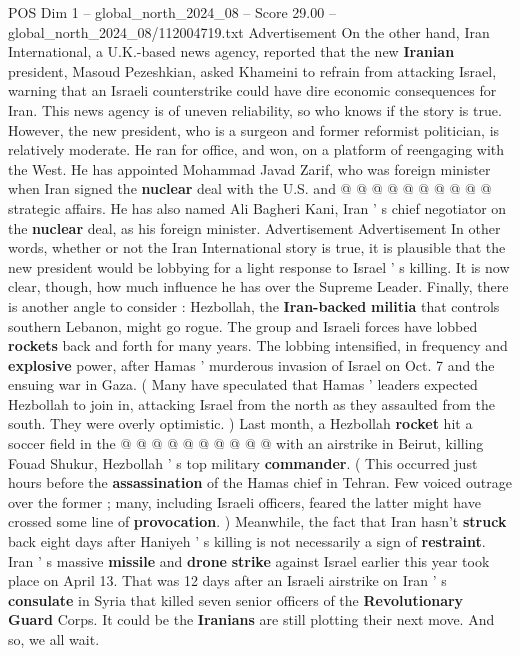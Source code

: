 \begin{textsample}{POS Dim 1 – global\_north\_2024\_08 – Score 29.00 – global\_north\_2024\_08/112004719.txt}
Advertisement On the other hand, Iran International, a U.K.-based news agency, reported that the new \textbf{Iranian} president, Masoud Pezeshkian, asked Khameini to refrain from attacking Israel, warning that an Israeli counterstrike could have dire economic consequences for Iran.
This news agency is of uneven reliability, so who knows if the story is true.
However, the new president, who is a surgeon and former reformist politician, is relatively moderate.
He ran for office, and won, on a platform of reengaging with the West.
He has appointed Mohammad Javad Zarif, who was foreign minister when Iran signed the \textbf{nuclear} deal with the U.S. and @ @ @ @ @ @ @ @ @ @ strategic affairs.
He has also named Ali Bagheri Kani, Iran ' s chief negotiator on the \textbf{nuclear} deal, as his foreign minister.
Advertisement Advertisement In other words, whether or not the Iran International story is true, it is plausible that the new president would be lobbying for a light response to Israel ' s killing.
It is now clear, though, how much influence he has over the Supreme Leader.
Finally, there is another angle to consider : Hezbollah, the \textbf{Iran-backed} \textbf{militia} that controls southern Lebanon, might go rogue.
The group and Israeli forces have lobbed \textbf{rockets} back and forth for many years.
The lobbing intensified, in frequency and \textbf{explosive} power, after Hamas ' murderous invasion of Israel on Oct. 7 and the ensuing war in Gaza. ( Many have speculated that Hamas ' leaders expected Hezbollah to join in, attacking Israel from the north as they assaulted from the south.
They were overly optimistic. ) Last month, a Hezbollah \textbf{rocket} hit a soccer field in the @ @ @ @ @ @ @ @ @ @ with an airstrike in Beirut, killing Fouad Shukur, Hezbollah ' s top military \textbf{commander}. ( This occurred just hours before the \textbf{assassination} of the Hamas chief in Tehran.
Few voiced outrage over the former ; many, including Israeli officers, feared the latter might have crossed some line of \textbf{provocation}. ) Meanwhile, the fact that Iran hasn't \textbf{struck} back eight days after Haniyeh ' s killing is not necessarily a sign of \textbf{restraint}.
Iran ' s massive \textbf{missile} and \textbf{drone} \textbf{strike} against Israel earlier this year took place on April 13.
That was 12 days after an Israeli airstrike on Iran ' s \textbf{consulate} in Syria that killed seven senior officers of the \textbf{Revolutionary} \textbf{Guard} Corps.
It could be the \textbf{Iranians} are still plotting their next move.
And so, we all wait.

\end{textsample}
